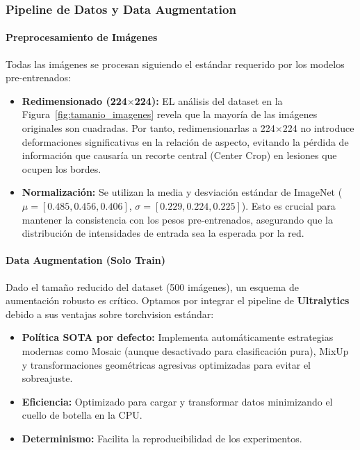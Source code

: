 \documentclass[12pt,a4paper]{article}
\begin{document}


\subsubsection{Pipeline de Datos y Data Augmentation}

\paragraph{Preprocesamiento de Imágenes}
Todas las imágenes se procesan siguiendo el estándar requerido por los modelos pre-entrenados:
\begin{itemize}
    \item \textbf{Redimensionado (224$\times$224):} EL análisis del dataset en la  Figura~\ref{fig:tamanio_imagenes} revela que la mayoría de las imágenes originales son cuadradas. Por tanto, redimensionarlas a 224$\times$224 no introduce deformaciones significativas en la relación de aspecto, evitando la pérdida de información que causaría un recorte central (Center Crop) en lesiones que ocupen los bordes.
    \item \textbf{Normalización:} Se utilizan la media y desviación estándar de ImageNet ($\mu = [0.485, 0.456, 0.406]$, $\sigma = [0.229, 0.224, 0.225]$). Esto es crucial para mantener la consistencia con los pesos pre-entrenados, asegurando que la distribución de intensidades de entrada sea la esperada por la red.
\end{itemize}

\paragraph{Data Augmentation (Solo Train)}
Dado el tamaño reducido del dataset (500 imágenes), un esquema de aumentación robusto es crítico. Optamos por integrar el pipeline de \textbf{Ultralytics} debido a sus ventajas sobre torchvision estándar:
\begin{itemize}
    \item \textbf{Política SOTA por defecto:} Implementa automáticamente estrategias modernas como Mosaic (aunque desactivado para clasificación pura), MixUp y transformaciones geométricas agresivas optimizadas para evitar el sobreajuste.
    \item \textbf{Eficiencia:} Optimizado para cargar y transformar datos minimizando el cuello de botella en la CPU.
    \item \textbf{Determinismo:} Facilita la reproducibilidad de los experimentos.
\end{itemize}
\end{document}
